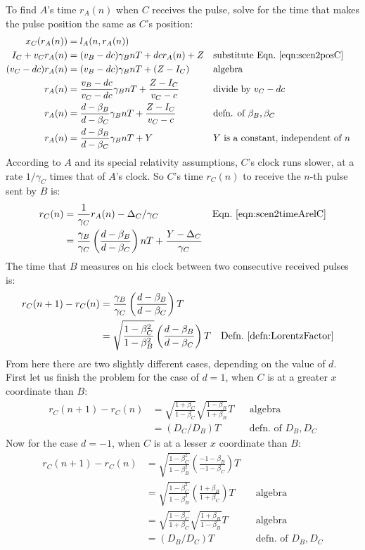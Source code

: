 \documentclass[a4paper]{article}
\theoremstyle{plain}
\theoremstyle{definition}
\begin{document}
To find $A$'s time $r_A(n)$ when $C$ receives the pulse,
solve for the time that makes the pulse position the same as $C$'s position:
\begin{align*}
x_C(r_A(n)) & = l_A(n, r_A(n)) \\
I_C + v_C r_A(n) & = (v_B - dc) \gamma_B nT + dc r_A(n) + Z & & \text{substitute Eqn.~\eqref{eqn:scen2posC}} \\
(v_C - dc) r_A(n) & = (v_B - dc) \gamma_B nT + (Z - I_C) & & \text{algebra} \\
r_A(n) & = \frac{v_B - dc}{v_C - dc} \gamma_B nT + \frac{Z - I_C}{v_C - c} & & \text{divide by $v_C-dc$} \\
r_A(n) & = \frac{d - \beta_B}{d -  \beta_C} \gamma_B nT + \frac{Z - I_C}{v_C - c} & & \text{defn. of $\beta_B, \beta_C$} \\
r_A(n) & = \frac{d - \beta_B}{d - \beta_C} \gamma_B nT + Y & & \text{$Y$ is a constant, independent of $n$}
\end{align*}
According to $A$ and its special relativity assumptions,
$C$'s clock runs slower, at a rate $1/\gamma_C$ times that of $A$'s clock.
So $C$'s time $r_C(n)$ to receive the $n$-th pulse sent by $B$ is:
\begin{align*}
r_C(n) & = \frac{1}{\gamma_C} r_A(n) - \Delta_C/\gamma_C & & \text{Eqn.~\eqref{eqn:scen2timeArelC}} \\
       & = \frac{\gamma_B}{\gamma_C} \left( \frac{d-\beta_B}{d-\beta_C} \right) nT + \frac{Y-\Delta_C}{\gamma_C}
\end{align*}
The time that $B$ measures on his clock between two consecutive received
pulses is:
\begin{align*}
r_C(n+1) - r_C(n)
  & = \frac{\gamma_B}{\gamma_C} \left( \frac{d-\beta_B}{d-\beta_C} \right) T \\
  & = \sqrt{ \frac{1-\beta_C^2}{1-\beta_B^2} } \left( \frac{d-\beta_B}{d-\beta_C} \right) T & & \text{Defn.~\eqref{defn:LorentzFactor}}
\end{align*}
From here there are two slightly different cases, depending on the
value of $d$.  First let us finish the problem for the case of $d=1$,
when $C$ is at a greater $x$ coordinate than $B$:
\begin{align*}
r_C(n+1) - r_C(n)
  & = \sqrt{ \frac{1+\beta_C}{1-\beta_C} } \sqrt { \frac{1-\beta_B}{1+\beta_B} } T & & \text{algebra} \\
  & = ( D_C / D_B ) T & & \text{defn. of $D_B, D_C$}
\end{align*}
Now for the case $d=-1$, when $C$ is at a lesser $x$ coordinate than
$B$:
\begin{align*}
r_C(n+1) - r_C(n)
  & = \sqrt{ \frac{1-\beta_C^2}{1-\beta_B^2} } \left( \frac{-1-\beta_B}{-1-\beta_C} \right) T \\
  & = \sqrt{ \frac{1-\beta_C^2}{1-\beta_B^2} } \left( \frac{1+\beta_B}{1+\beta_C} \right) T & & \text{algebra} \\
  & = \sqrt{ \frac{1-\beta_C}{1+\beta_C} } \sqrt { \frac{1+\beta_B}{1-\beta_B} } T & & \text{algebra} \\
  & = ( D_B / D_C ) T & & \text{defn. of $D_B, D_C$}
\end{align*}
\end{document}
